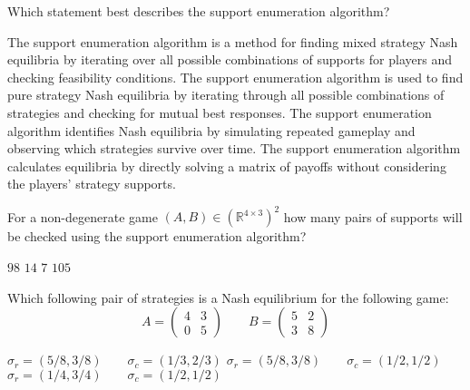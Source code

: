 \documentclass{exam}
\begin{document}
\begin{questions}
        
    \question
    Which statement best describes the support enumeration algorithm?

    \begin{checkboxes}
\choice The support enumeration algorithm is a method for finding mixed strategy Nash equilibria by iterating over all possible combinations of supports for players and checking feasibility conditions.
\choice The support enumeration algorithm is used to find pure strategy Nash equilibria by iterating through all possible combinations of strategies and checking for mutual best responses.
\choice The support enumeration algorithm identifies Nash equilibria by simulating repeated gameplay and observing which strategies survive over time.
\choice The support enumeration algorithm calculates equilibria by directly solving a matrix of payoffs without considering the players’ strategy supports.
    \end{checkboxes}


\question
    For a non-degenerate game \((A, B)\in{\left(\mathbb{R}^{4 \times 3}\right)}^2\) how many pairs of supports
    will be checked using the support enumeration algorithm?

    \begin{checkboxes}
        \choice \(98\)
        \choice \(14\)
        \choice \(7\)
        \choice \(105\)
    \end{checkboxes}

    \question Which following pair of strategies is a Nash equilibrium for the
    following game:
     \[
     A=\begin{pmatrix}4 & 3\\ 0& 5\end{pmatrix}
     \qquad
     B=\begin{pmatrix}5 & 2\\ 3& 8\end{pmatrix}
 \]
    \begin{checkboxes}
        \choice
    \(
    \sigma_r=(5/8, 3/8)\qquad\sigma_c = (1/3, 2/3)
    \)
        \choice
    \(
    \sigma_r=(5/8, 3/8)\qquad\sigma_c = (1/2, 1/2)
    \)
        \choice
    \(
    \sigma_r=(1/4, 3/4)\qquad\sigma_c = (1/2, 1/2)
    \)
\end{checkboxes}

\end{questions}
\end{document}
